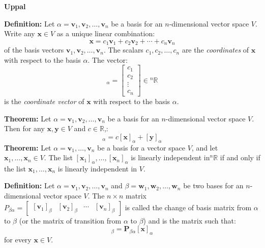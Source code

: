 \documentclass{article}
\newcommand{\bff}[1]{\mathbf{#1}}
\begin{document}
    \hfill
    \begin{minipage}[t]{.45\textwidth}
        \begin{center}
            \textbf{Uppal}
        \end{center}
        \textbf{Definition:} Let $\alpha = \bff{v}_1, \bff{v}_2, \dots, \bff{v}_n$ be a basis for an $n$-dimensional vector space $V$. Write any $\bff{x} \in V$ as a unique linear combination:
        \begin{equation*}
            \bff{x}=c_1\bff{v}_1 + c_2\bff{v}_2 + \cdots + c_n\bff{v}_n
        \end{equation*}
        of the basis vectors $\bff{v}_1, \bff{v}_2, \dots, \bff{v}_n$. The scalars $c_1,c_2,\dots,c_n$ are the \textit{coordinates} of $\bff{x}$ with respect to the basis $\alpha$. The vector:
        \begin{equation*}
            [\bff{x}]_\alpha = \begin{bmatrix}
                c_1\\c_2\\ \vdots \\ c_n
            \end{bmatrix} \in {^n}\mathbb{R}
        \end{equation*}
        is the \textit{coordinate vector} of $\bff{x}$ with respect to the basis $\alpha$.
        \vspace{2mm}

        \textbf{Theorem:} Let $\alpha=\bff{v}_1,\bff{v}_2,\dots,\bff{v}_n$ be a basis for an $n$-dimensional vector space $V$. Then for any $\bff{x},\bff{y} \in V$ and $c \in \mathbb{R}$,:
        \begin{equation*}
            [c\bff{x}+\bff{y}]_\alpha = c[\bff{x}]_\alpha + [\bff{y}]_\alpha
        \end{equation*}
        \textbf{Theorem:} Let $\alpha=\bff{v}_1,\dots,\bff{v}_n$ be a basis for a vector space $V$, and let $\bff{x}_1,\dots,\bff{x}_n \in V.$ The list $[\bff{x}_1]_\alpha, \dots, [\bff{x}_n]_\alpha$ is linearly independent in${^n}\mathbb{R}$ if and only if the list $\bff{x}_1, \dots, \bff{x}_n$ is linearly independent in $V$.
        \vspace{2mm}

        \textbf{Definition:} Let $\alpha=\bff{v}_1,\bff{v}_2,\dots,\bff{v}_n$ and $\beta=\bff{w}_1,\bff{w}_2,\dots,\bff{w}_n$ be two bases for an $n$-dimensional vector space $V$. The $n\times n$ matrix $P_{\beta\alpha} = \begin{bmatrix}
            [\bff{v}_1]_\beta & [\bff{v}_2]_\beta & \cdots & [\bff{v}_n]_\beta
        \end{bmatrix}$ is called the change of basis matrix from $\alpha$ to $\beta$ (or the matrix of transition from $\alpha$ to $\beta$) and is the matrix such that:
        \begin{equation*}
            [\bff{x}]_\beta = \bff{P}_{\beta\alpha}[\bff{x}]_\alpha
        \end{equation*}
        for every $\bff{x} \in V$.
        \vspace{2mm}


\end{minipage}
\end{document}
